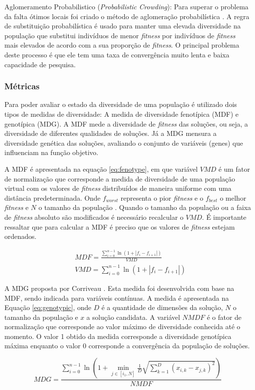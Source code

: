 Aglomeramento Probabilistico (\textit{Probabilistic Crowding}): Para superar o problema da falta ótimos locais foi criado o método de aglomeração probabilística \cite{probabilisti_crowding}. A regra de substituição probabilística é usado para manter uma elevada diversidade na população que substitui indivíduos de menor \textit{fitness} por indivíduos de \textit{fitness} mais elevados de acordo com a sua proporção de \textit{fitness}. O principal problema deste processo é que ele tem uma taxa de convergência muito lenta e baixa capacidade de pesquisa.

\subsubsection{Métricas}
\label{sec:evaluete_diversity}

Para poder avaliar o estado da diversidade de uma população é utilizado dois tipos de medidas de diversidade: A medida de diversidade fenotípica (MDF) e genotípica (MDG). A MDF mede a diversidade de \textit{fitness} das soluções, ou seja, a diversidade de diferentes qualidades de soluções. Já a MDG mensura a diversidade genética das soluções, avaliando o conjunto de variáveis (genes) que influenciam na função objetivo.

A MDF é apresentada na equação \ref{eq:fenotype}, em que variável $VMD$ é um fator de normalização que corresponde a medida de diversidade de uma população virtual com os valores de \textit{fitness} distribuídos de maneira uniforme com uma distância predeterminada. Onde $f_{worst}$ representa o pior \textit{fitness} e o $f_{best}$ o melhor \textit{fitness} e $N$ o tamanho da população \cite{phenotypic}. Quando o tamanho da população ou a faixa de \textit{fitness} absoluto são modificados é necessário recalcular o $VMD$. É importante ressaltar que para calcular a MDF é preciso que os valores de \textit{fitness} estejam ordenados.

\begin{equation}
\label{eq:fenotype}
\begin{split}
& MDF = \frac{\sum_{i=0}^{n-1} \ln(1 + |f_i - f_{i+1}|)}{VMD} \\
& VMD = \sum_{i=0}^{n-1} \ln(1 + |f_i - f_{i+1}|)
\end{split}
\end{equation}

A MDG  proposta por Corriveau \cite{genotypic}. Esta medida foi desenvolvida com base na MDF, sendo indicada para variáveis contínuas. A medida é apresentada na Equação \ref{eq:genotypic}, onde $D$ é a quantidade de dimensões da solução, $N$ o tamanho da população e $x$ a solução candidata. A variável
$NMDF$ é o fator de normalização que corresponde ao valor máximo de diversidade conhecida até o momento. O valor 1 obtido da medida corresponde a diversidade genotípica máxima enquanto o valor 0 corresponde a convergência da população de soluções.

\begin{equation}
\label{eq:genotypic}
MDG = \frac{\sum_{i=0}^{n-1} \ln \left(1 + \min_{j \in [i_1,N]} \frac{1}{D} \sqrt{ \sum\limits_{k=1}^{D} (x_{i,k} - x_{j,k})^2}\right)}{NMDF}
\end{equation}